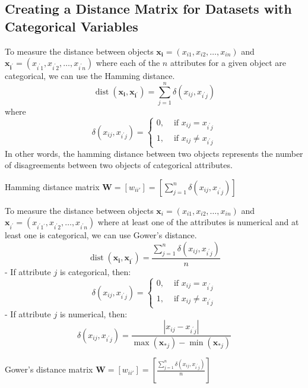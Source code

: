 \documentclass[11pt]{elegantbook}
\begin{document}
\subsection{Creating a Distance Matrix for Datasets with Categorical Variables}
\begin{definition}
    \normalfont
    To measure the distance between objects $\boldsymbol{x}_{\boldsymbol{i}}=\left(x_{i 1}, x_{i 2}, \ldots, x_{i n}\right)$ and $\boldsymbol{x}_{\boldsymbol{i}^{\prime}}=\left(x_{i^{\prime} 1}, x_{i^{\prime} 2}, \ldots, x_{i^{\prime} n}\right)$ where each of the $n$ attributes for a given object are categorical, we can use the Hamming distance.
    $$
    \operatorname{dist}\left(\boldsymbol{x}_{\boldsymbol{i}}, \boldsymbol{x}_{\boldsymbol{i}^{\prime}}\right)=\sum_{j=1}^n \delta\left(x_{i j}, x_{i^{\prime} j}\right)
    $$
    where
    $$
    \delta\left(x_{i j}, x_{i^{\prime} j}\right)=\left\{\begin{array}{ll}
    0, & \text { if } x_{i j}=x_{i^{\prime} j} \\
    1, & \text { if } x_{i j} \neq x_{i^{\prime} j}
    \end{array}\right.
    $$
    In other words, the hamming distance between two objects represents the number of disagreements between two objects of categorical attributes.
\end{definition}
Hamming distance matrix $\mathbf{W}=[w_{ii'}]=[\sum_{j=1}^n \delta\left(x_{i j}, x_{i^{\prime} j}\right)]$

\begin{definition}
    \normalfont
    To measure the distance between objects $\boldsymbol{x}_i=\left(x_{i 1}, x_{i 2}, \ldots, x_{i n}\right)$ and $\boldsymbol{x}_{i^{\prime}}=\left(x_{i^{\prime} 1^{\prime}}, x_{i^{\prime} 2}, \ldots, x_{i^{\prime} n}\right)$ where at least one of the attributes is numerical and at least one is categorical, we can use Gower's distance.
    $$
    \operatorname{dist}\left(\boldsymbol{x}_{\boldsymbol{i}}, \boldsymbol{x}_{\boldsymbol{i}^{\prime}}\right)=\frac{\sum_{j=1}^n \delta\left(x_{i j}, x_{i^{\prime} j}\right)}{n}
    $$
    - If attribute $j$ is categorical, then:
    $$
    \delta\left(x_{i j}, x_{i^{\prime} j}\right)=\left\{\begin{array}{ll}
    0, & \text { if } x_{i j}=x_{i^{\prime} j} \\
    1, & \text { if } x_{i j} \neq x_{i^{\prime} j}
    \end{array}\right.
    $$
    - If attribute $j$ is numerical, then:
    $$
    \delta\left(x_{i j}, x_{i^{\prime} j}\right)=\frac{\left|x_{i j}-x_{i^{\prime} j}\right|}{\max \left(\boldsymbol{x}_{* j}\right)-\min \left(\boldsymbol{x}_{* j}\right)}
    $$
\end{definition}
Gower's distance matrix $\mathbf{W}=[w_{ii'}]=[\frac{\sum_{j=1}^n \delta\left(x_{i j}, x_{i^{\prime} j}\right)}{n}]$
\end{document}
